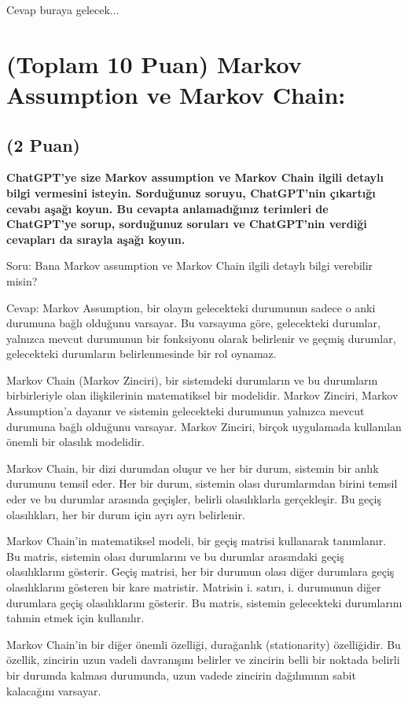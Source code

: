 \documentclass[11pt]{article}
\begin{document}
Cevap buraya gelecek...

\section{(Toplam 10 Puan) Markov Assumption ve Markov Chain:}

\subsection{(2 Puan)} \textbf{ChatGPT’ye size Markov assumption ve Markov Chain ilgili detaylı bilgi vermesini isteyin. Sorduğunuz soruyu, ChatGPT'nin çıkartığı cevabı aşağı koyun. Bu cevapta anlamadığınız terimleri de ChatGPT’ye sorup, sorduğunuz soruları ve ChatGPT’nin verdiği cevapları da sırayla aşağı koyun.}

Soru: Bana Markov assumption ve Markov Chain ilgili detaylı bilgi verebilir misin?

Cevap: Markov Assumption, bir olayın gelecekteki durumunun sadece o anki durumuna bağlı olduğunu varsayar. Bu varsayıma göre, gelecekteki durumlar, yalnızca mevcut durumunun bir fonksiyonu olarak belirlenir ve geçmiş durumlar, gelecekteki durumların belirlenmesinde bir rol oynamaz.

Markov Chain (Markov Zinciri), bir sistemdeki durumların ve bu durumların birbirleriyle olan ilişkilerinin matematiksel bir modelidir. Markov Zinciri, Markov Assumption'a dayanır ve sistemin gelecekteki durumunun yalnızca mevcut durumuna bağlı olduğunu varsayar. Markov Zinciri, birçok uygulamada kullanılan önemli bir olasılık modelidir.

Markov Chain, bir dizi durumdan oluşur ve her bir durum, sistemin bir anlık durumunu temsil eder. Her bir durum, sistemin olası durumlarından birini temsil eder ve bu durumlar arasında geçişler, belirli olasılıklarla gerçekleşir. Bu geçiş olasılıkları, her bir durum için ayrı ayrı belirlenir.

Markov Chain'in matematiksel modeli, bir geçiş matrisi kullanarak tanımlanır. Bu matris, sistemin olası durumlarını ve bu durumlar arasındaki geçiş olasılıklarını gösterir. Geçiş matrisi, her bir durumun olası diğer durumlara geçiş olasılıklarını gösteren bir kare matristir. Matrisin i. satırı, i. durumunun diğer durumlara geçiş olasılıklarını gösterir. Bu matris, sistemin gelecekteki durumlarını tahmin etmek için kullanılır.

Markov Chain'in bir diğer önemli özelliği, durağanlık (stationarity) özelliğidir. Bu özellik, zincirin uzun vadeli davranışını belirler ve zincirin belli bir noktada belirli bir durumda kalması durumunda, uzun vadede zincirin dağılımının sabit kalacağını varsayar.
\end{document}
